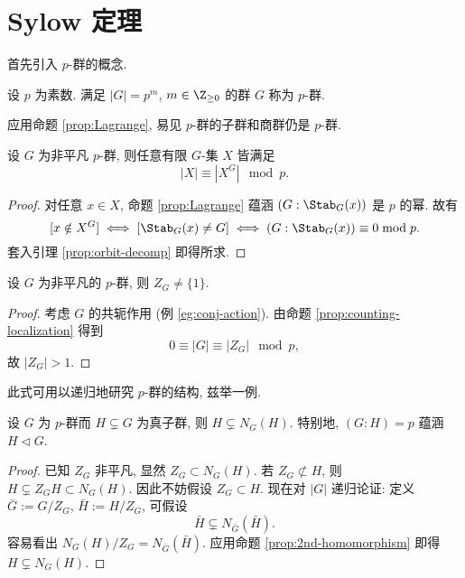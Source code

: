 \section{Sylow 定理}\label{sec:Sylow}
首先引入 $p$-群的概念.

\begin{definition}\label{def:p-group}
	设 $p$ 为素数. 满足 $|G|=p^m$, $m \in \Z_{\geq 0}$ 的群 $G$ 称为 $p$-群.
\end{definition}
应用命题 \ref{prop:Lagrange}, 易见 $p$-群的子群和商群仍是 $p$-群.

\begin{proposition}\label{prop:counting-localization}
	设 $G$ 为非平凡 $p$-群, 则任意有限 $G$-集 $X$ 皆满足
	\[ |X| \equiv \left\lvert X^G \right\rvert \mod p. \]
\end{proposition}
\begin{proof}
	对任意 $x \in X$, 命题 \ref{prop:Lagrange} 蕴涵 $(G: \Stab_G(x))$ 是 $p$ 的幂. 故有
	\[ [ x \notin X^G] \iff [ \Stab_G(x) \neq G ] \iff (G: \Stab_G(x)) \equiv 0 \bmod p . \]
	套入引理 \ref{prop:orbit-decomp} 即得所求.
\end{proof}

\begin{corollary}\label{prop:p-group-center}
	设 $G$ 为非平凡的 $p$-群, 则 $Z_G \neq \{1\}$.
\end{corollary}
\begin{proof}
	考虑 $G$ 的共轭作用 (例 \ref{eg:conj-action}). 由命题 \ref{prop:counting-localization} 得到
	\[ 0 \equiv |G| \equiv |Z_G| \mod p , \]
	故 $|Z_G| > 1$.
\end{proof}

此式可用以递归地研究 $p$-群的结构, 兹举一例.
\begin{corollary}
	设 $G$ 为 $p$-群而 $H \subsetneq G$ 为真子群, 则 $H \subsetneq N_G(H)$. 特别地, $(G:H)=p$ 蕴涵 $H \lhd G$.
\end{corollary}
\begin{proof}
	已知 $Z_G$ 非平凡, 显然 $Z_G \subset N_G(H)$. 若 $Z_G \not\subset H$, 则 $H \subsetneq Z_G H \subset N_G(H)$. 因此不妨假设 $Z_G \subset H$. 现在对 $|G|$ 递归论证: 定义 $\bar{G} := G/Z_G$, $\bar{H} := H/Z_G$, 可假设
	\[ \bar{H} \subsetneq N_{\bar{G}}(\bar{H}). \]
	容易看出 $N_G(H)/Z_G = N_{\bar{G}}(\bar{H})$. 应用命题 \ref{prop:2nd-homomorphism} 即得 $H \subsetneq N_G(H)$.
\end{proof}

